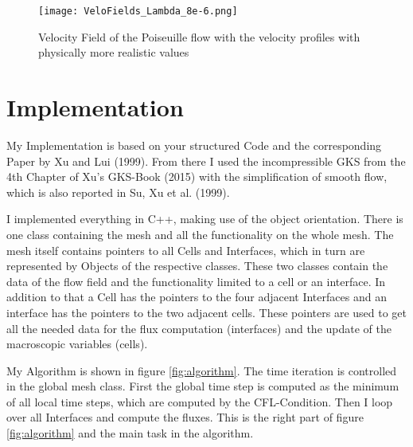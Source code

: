 \documentclass[
	pdftex,             %
	12pt,				%
	a4paper,		   	%
	english,				%
	oneside,			%
]{article}
\begin{document}
\begin{figure}
\texttt{[image: VeloFields\_Lambda\_8e-6.png]}
\caption{Velocity Field of the Poiseuille flow with the velocity profiles with physically more realistic values}
\label{fig:veloProfilePoiseuille_L8e-6}
\end{figure}

\clearpage

\section{Implementation}

My Implementation is based on your structured Code and the corresponding Paper by Xu and Lui (1999). From there I used the incompressible GKS from the 4th Chapter of Xu's GKS-Book (2015) with the simplification of smooth flow, which is also reported in Su, Xu et al. (1999).

I implemented everything in C++, making use of the object orientation. There is one class containing the mesh and all the functionality on the whole mesh. The mesh itself contains pointers to all Cells and Interfaces, which in turn are represented by Objects of the respective classes. These two classes contain the data of the flow field and the functionality limited to a cell or an interface. In addition to that a Cell has the pointers to the four adjacent Interfaces and an interface has the pointers to the two adjacent cells. These pointers are used to get all the needed data for the flux computation (interfaces) and the update of the macroscopic variables (cells). 

My Algorithm is shown in figure \ref{fig:algorithm}. The time iteration is controlled in the global mesh class. First the global time step is computed as the minimum of all local time steps, which are computed by the CFL-Condition. Then I loop over all Interfaces and compute the fluxes. This is the right part of figure \ref{fig:algorithm} and the main task in the algorithm.
\end{document}

